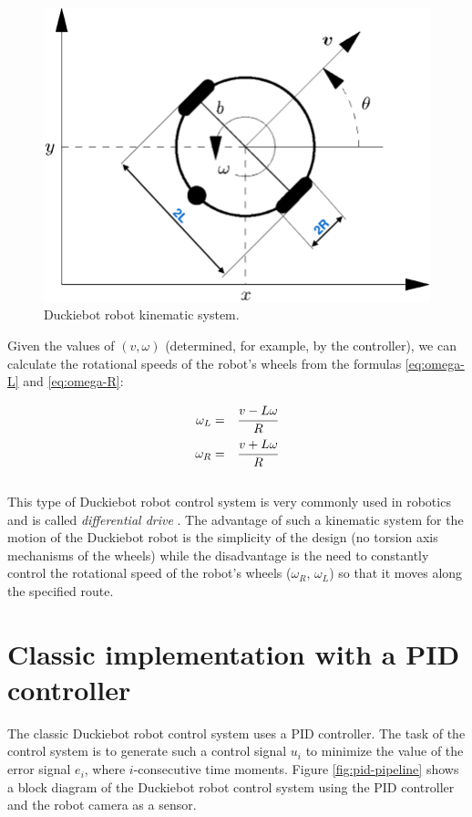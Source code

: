 \documentclass[conference]{IEEEtran}
\begin{document}
\begin{figure}[h]
    \centering
    \includegraphics[width=.8\columnwidth]{dt-kinematic}
    \caption{Duckiebot robot kinematic system.}
    \label{fig:duckiebot-kinematics}
\end{figure}

Given the values of $(v, \omega)$ (determined, for example, by the controller), we can calculate the rotational speeds of the robot's wheels from the formulas \eqref{eq:omega-L} and \eqref{eq:omega-R}:

\begin{eqnarray}
	\omega_L & = & \cfrac{v-L\omega}{R} \label{eq:omega-L} \\
	\omega_R & = & \cfrac{v+L\omega}{R} \label{eq:omega-R}
\end{eqnarray}
\\
This type of Duckiebot robot control system is very commonly used in robotics and is called \emph{differential drive} \cite{siegwart2011introduction}. The advantage of such a kinematic system for the motion of the Duckiebot robot is the simplicity of the design (no torsion axis mechanisms of the wheels) while the disadvantage is the need to constantly control the rotational speed of the robot's wheels ($\omega_R$, $\omega_L$) so that it moves along the specified route.


\section{Classic implementation with a PID controller}\label{sec:pid-controller}
The classic Duckiebot robot control system uses a PID controller. The task of the control system is to generate such a control signal $u_i$ to minimize the value of the error signal $e_i$, where $i$-consecutive time moments. Figure \ref{fig:pid-pipeline} shows a block diagram of the Duckiebot robot control system using the PID controller and the robot camera as a sensor.
\end{document}
